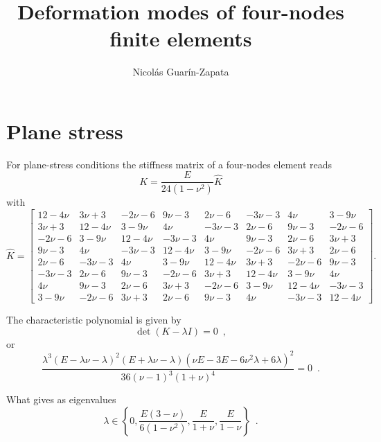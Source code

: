 \documentclass[12pt,letterpaper]{article}
\title{\textbf{Deformation modes of four-nodes finite elements}}
\author{Nicolás Guarín-Zapata}
\begin{document}
\maketitle

\section{Plane stress}
For plane-stress conditions the stiffness matrix of a four-nodes element reads
\begin{equation}
  K = \frac{E}{24(1 - \nu^2)} \hat{K}
\end{equation}
with
\begin{equation}
  \hat{K} = 
  \begin{bmatrix}
    12 - 4\nu & 3 \nu + 3 & - 2 \nu - 6 & 9 \nu - 3 & 2 \nu - 6 & - 3 \nu - 3 & 4 \nu & 3 - 9\nu\\
    3 \nu + 3 & 12 - 4\nu & 3 - 9\nu & 4 \nu & - 3 \nu - 3 & 2 \nu - 6 & 9 \nu - 3 & - 2 \nu - 6\\
    - 2 \nu - 6 & 3 - 9\nu & 12 - 4\nu & - 3 \nu - 3 & 4 \nu & 9 \nu - 3 & 2 \nu - 6 & 3 \nu + 3\\
    9 \nu - 3 & 4 \nu & - 3 \nu - 3 & 12 - 4\nu & 3 - 9\nu & - 2 \nu - 6 & 3 \nu + 3 & 2 \nu - 6\\
    2 \nu - 6 & - 3 \nu - 3 & 4 \nu & 3 - 9\nu & 12 - 4\nu & 3 \nu + 3 & - 2 \nu - 6 & 9 \nu - 3\\
    - 3 \nu - 3 & 2 \nu - 6 & 9 \nu - 3 & - 2 \nu - 6 & 3 \nu + 3 & 12 - 4\nu & 3 - 9\nu & 4 \nu\\
    4 \nu & 9 \nu - 3 & 2 \nu - 6 & 3 \nu + 3 & - 2 \nu - 6 & 3 - 9\nu & 12 - 4\nu & - 3 \nu - 3\\
    3 - 9\nu & - 2 \nu - 6 & 3 \nu + 3 & 2 \nu - 6 & 9 \nu - 3 & 4 \nu & - 3 \nu - 3 & 12 - 4\nu
  \end{bmatrix} .
  \label{eq:stiff}
\end{equation}

The characteristic polynomial is given by
\[\det(K - \lambda I)= 0\enspace ,\]
or
\begin{equation}
  \frac{\lambda^3(E - \lambda\nu - \lambda)^2 (E + \lambda \nu - \lambda) (\nu E - 3E - 6\nu^2\lambda + 6\lambda)^2}{36 (\nu - 1)^3 (1 + \nu)^4} = 0 \enspace .
\end{equation}

What gives as eigenvalues
\[\lambda \in \left\{0,
	\frac{E(3 - \nu)}{6(1 - \nu^2)},
	\frac{E}{1 + \nu},
	\frac{E}{1 - \nu} \right\} \enspace .
\]
\end{document}
